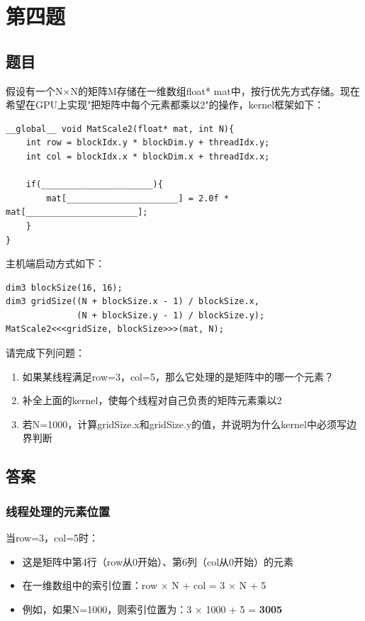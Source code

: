 \chapter{第四题}

\section{题目}

假设有一个N×N的矩阵M存储在一维数组float* mat中，按行优先方式存储。现在希望在GPU上实现"把矩阵中每个元素都乘以2"的操作，kernel框架如下：

\begin{lstlisting}[style=cleancpp]
__global__ void MatScale2(float* mat, int N){
    int row = blockIdx.y * blockDim.y + threadIdx.y;
    int col = blockIdx.x * blockDim.x + threadIdx.x;
    
    if(______________________){
        mat[______________________] = 2.0f * mat[______________________];
    }
}
\end{lstlisting}

主机端启动方式如下：
\begin{lstlisting}[style=cleancpp]
dim3 blockSize(16, 16);
dim3 gridSize((N + blockSize.x - 1) / blockSize.x, 
              (N + blockSize.y - 1) / blockSize.y);
MatScale2<<<gridSize, blockSize>>>(mat, N);
\end{lstlisting}

请完成下列问题：
\begin{enumerate}
    \item 如果某线程满足row=3，col=5，那么它处理的是矩阵中的哪一个元素？
    \item 补全上面的kernel，使每个线程对自己负责的矩阵元素乘以2
    \item 若N=1000，计算gridSize.x和gridSize.y的值，并说明为什么kernel中必须写边界判断
\end{enumerate}

\section{答案}
\subsection{线程处理的元素位置}

当row=3，col=5时：

\begin{itemize}
    \item 这是矩阵中第4行（row从0开始）、第6列（col从0开始）的元素
    \item 在一维数组中的索引位置：row × N + col = 3 × N + 5
    \item 例如，如果N=1000，则索引位置为：3 × 1000 + 5 = \textbf{3005}
\end{itemize}

